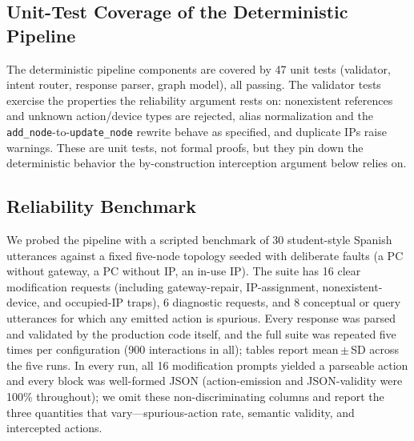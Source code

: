 \documentclass[conference,a4paper]{IEEEtran}
\newcommand{\bTotalCalls}{900} %
\begin{document}
\subsection{Unit-Test Coverage of the Deterministic Pipeline}
The deterministic pipeline components are covered by 47 unit tests (validator, intent router, response parser, graph model), all passing. The validator tests exercise the properties the reliability argument rests on: nonexistent references and unknown action/device types are rejected, alias normalization and the \texttt{add\_node}-to-\texttt{update\_node} rewrite behave as specified, and duplicate IPs raise warnings. These are unit tests, not formal proofs, but they pin down the deterministic behavior the by-construction interception argument below relies on.

\subsection{Reliability Benchmark}
We probed the pipeline with a scripted benchmark of 30 student-style Spanish utterances against a fixed five-node topology seeded with deliberate faults (a PC without gateway, a PC without IP, an in-use IP). The suite has 16 clear modification requests (including gateway-repair, IP-assignment, nonexistent-device, and occupied-IP traps), 6 diagnostic requests, and 8 conceptual or query utterances for which any emitted action is spurious. Every response was parsed and validated by the production code itself, and the full suite was repeated five times per configuration (\bTotalCalls{} interactions in all); tables report mean\,$\pm$\,SD across the five runs. In every run, all 16 modification prompts yielded a parseable action and every block was well-formed JSON (action-emission and JSON-validity were 100\% throughout); we omit these non-discriminating columns and report the three quantities that vary---spurious-action rate, semantic validity, and intercepted actions.
\end{document}
